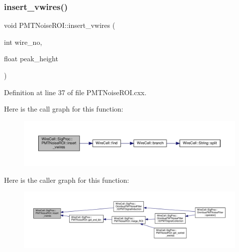 \subsubsection{\texorpdfstring{insert\+\_\+vwires()}{insert\_vwires()}}
{\footnotesize\ttfamily void P\+M\+T\+Noise\+R\+O\+I\+::insert\+\_\+vwires (\begin{DoxyParamCaption}\item[{int}]{wire\+\_\+no,  }\item[{float}]{peak\+\_\+height }\end{DoxyParamCaption})}



Definition at line 37 of file P\+M\+T\+Noise\+R\+O\+I.\+cxx.

Here is the call graph for this function\+:
\nopagebreak
\begin{figure}[H]
\begin{center}
\leavevmode
\includegraphics[width=350pt]{class_wire_cell_1_1_sig_proc_1_1_p_m_t_noise_r_o_i_a117ae1e99cce01f1c72a55905f7fcf7e_cgraph}
\end{center}
\end{figure}
Here is the caller graph for this function\+:
\nopagebreak
\begin{figure}[H]
\begin{center}
\leavevmode
\includegraphics[width=350pt]{class_wire_cell_1_1_sig_proc_1_1_p_m_t_noise_r_o_i_a117ae1e99cce01f1c72a55905f7fcf7e_icgraph}
\end{center}
\end{figure}
\mbox{\label{class_wire_cell_1_1_sig_proc_1_1_p_m_t_noise_r_o_i_a4b2640ed0856098cada1ba918b1e53d6}} 
